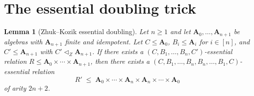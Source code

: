 \documentclass[11pt]{article}
\theoremstyle{mainplain}
\newtheorem{lemma}[theorem]{Lemma}
\theoremstyle{mainroman}
\theoremstyle{definition}
\numberwithin{equation}{section}
\newcommand{\bA}{\mathbf A}
\newcommand{\aZ}{\lhd_{Z}}
\begin{document}
\section{The essential doubling trick}\label{sec:doubling}

\begin{lemma}[Zhuk--Kozik essential doubling]\label{lem:doubling}
Let $n\ge1$ and let $\bA_0,\dots,\bA_{n+1}$ be algebras with $\bA_{n+1}$
finite and idempotent. Let $C\le\bA_0$, $B_i\le\bA_i$ for $i\in[n]$, and
$C'\le\bA_{n+1}$ with $C'\aZ\bA_{n+1}$. If there exists a
$(C,B_1,\dots,B_n,C')$-essential relation
$R\le\bA_0\times\cdots\times\bA_{n+1}$, then there exists a
$(C,B_1,\dots,B_n,B_n,\dots,B_1,C)$-essential relation
\[
 R'\;\le\;\bA_0\times\cdots\times\bA_n\times\bA_n\times\cdots\times\bA_0
\]
of arity $2n+2$.
\end{lemma}
\end{document}
